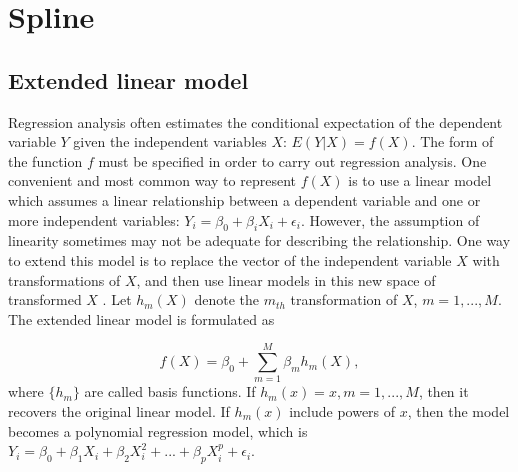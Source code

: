 \documentclass{article}
\begin{document}
\section{Spline}
	
\subsection{Extended linear model}
Regression analysis often estimates the conditional expectation of the dependent variable $Y$ given the independent variables $X$: $E(Y|X) = f(X)$. The form of the function $f$ must be specified in order to carry out regression analysis. One convenient and most common way to represent $f(X)$ is to use a linear model which assumes a linear relationship between a dependent variable and one or more independent variables: $Y_i= \beta_0+\beta_iX_i+\epsilon_i$. However, the assumption of linearity sometimes may not be adequate for describing the relationship. One way to extend this model is to replace the vector of the independent variable $X$ with transformations of $X$, and then use linear models in this new space of transformed $X$ \cite{friedman2001elements}. Let $h_m(X)$ denote the $m_{th}$ transformation of $X$, $m=1,...,M$. The extended linear model is formulated as

\begin{equation}
f(X) = \beta_0+ \sum_{m=1}^{M} \beta_mh_m(X),
\end{equation}
where $\{h_m\}$ are called basis functions. If $h_m(x) = x, m=1,...,M$, then it recovers the original linear model. If $h_m(x)$ include powers of $x$, then the model becomes a polynomial regression model, which is $Y_i=\beta_0+\beta_1X_i+\beta_2X_i^2+...+\beta_pX_i^p + \epsilon_i$.
\end{document}
